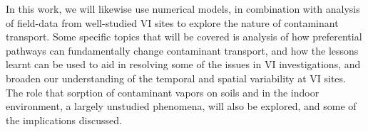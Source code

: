 In this work, we will likewise use numerical models, in combination with analysis of field-data from well-studied VI sites to explore the nature of contaminant transport.
Some specific topics that will be covered is analysis of how preferential pathways can fundamentally change contaminant transport, and how the lessons learnt can be used to aid in resolving some of the issues in VI investigations, and broaden our understanding of the temporal and spatial variability at VI sites.
The role that sorption of contaminant vapors on soils and in the indoor environment, a largely unstudied phenomena, will also be explored, and some of the implications discussed.\par
